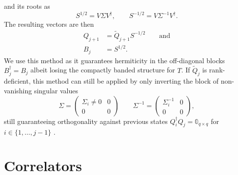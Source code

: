 and its roots as
\begin{equation}
    S^{1/2} = V \Sigma V^\dag,
    \qquad
    S^{-1/2} = V \Sigma^{-1} V^\dag.
\end{equation}
The resulting vectors are then
\begin{align}
    Q_{j+1} & = \tilde Q_{j+1} S^{-1/2} \qquad \text{and} \\
    B_j     & = S^{1/2}.
\end{align}
We use this method as it guarantees hermiticity in the off-diagonal blocks $B_j^\dag = B_j$
albeit losing the compactly banded structure for $T$.
If $\tilde Q_j$ is rank-deficient,
this method can still be applied \cite{Brass2021} by only inverting the block of
non-vanishing singular values
\begin{equation}
    \Sigma =
    \begin{pmatrix}
        \Sigma_i \neq 0 & 0 \\
        0               & 0
    \end{pmatrix}
    \qquad
    \Sigma^{-1} =
    \begin{pmatrix}
        \Sigma_i^{-1} & 0 \\
        0             & 0
    \end{pmatrix},
\end{equation}
still guaranteeing orthogonality against previous states $Q_i^\dag Q_j = \mathbb{0}_{q\times q}$
for $i \in \{1,\ldots,j-1\}$ \cite{Golub2013}.

\section{Correlators}
\label{sec:correlators}

